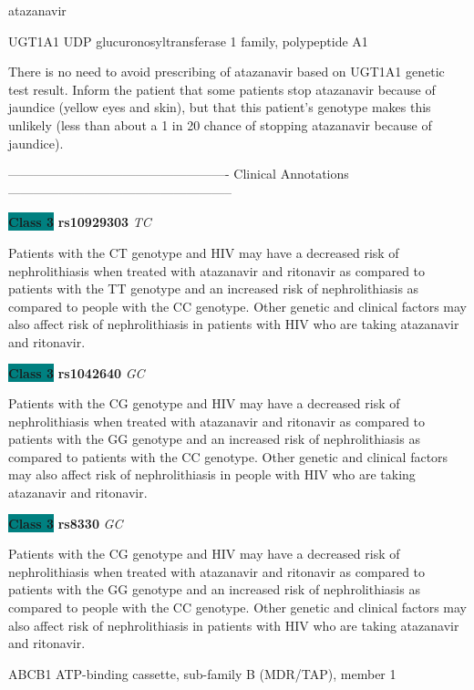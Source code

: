 \documentclass{resume} %
\begin{document}
\begin{rSection}{ atazanavir }
\begin{rSubsection}{ UGT1A1 }{ UDP glucuronosyltransferase 1 family, polypeptide A1 }{}{}
\item[] There is no need to avoid prescribing of atazanavir based on UGT1A1 genetic test result. Inform the patient that some patients stop atazanavir because of jaundice (yellow eyes and skin), but that this patient’s genotype makes this unlikely (less than about a 1 in 20 chance of stopping atazanavir because of jaundice).
\item[] ---------------------------------------------------- Clinical Annotations -----------------------------------------------------\newline
\item \textbf{\colorbox{teal} {Class 3}} \textbf{ rs10929303 } \textit{ TC }
\item[] Patients with the CT genotype and HIV may have a decreased risk of nephrolithiasis when treated with atazanavir and ritonavir as compared to patients with the TT genotype and an increased risk of nephrolithiasis as compared to people with the CC genotype. Other genetic and clinical factors may also affect risk of nephrolithiasis in patients with HIV who are taking atazanavir and ritonavir. \item \textbf{\colorbox{teal} {Class 3}} \textbf{ rs1042640 } \textit{ GC }
\item[] Patients with the CG genotype and HIV may have a decreased risk of nephrolithiasis when treated with atazanavir and ritonavir as compared to patients with the GG genotype and an increased risk of nephrolithiasis as compared to patients with the CC genotype. Other genetic and clinical factors may also affect risk of nephrolithiasis in people with HIV who are taking atazanavir and ritonavir.\item \textbf{\colorbox{teal} {Class 3}} \textbf{ rs8330 } \textit{ GC }
\item[] Patients with the CG genotype and HIV may have a decreased risk of nephrolithiasis when treated with atazanavir and ritonavir as compared to patients with the GG genotype and an increased risk of nephrolithiasis as compared to people with the CC genotype. Other genetic and clinical factors may also affect risk of nephrolithiasis in patients with HIV who are taking atazanavir and ritonavir.
\end{rSubsection}\begin{rSubsection}{ ABCB1 }{ ATP-binding cassette, sub-family B (MDR/TAP), member 1 }{}{}
\item[]


\end{rSubsection}
\end{rSection}
\end{document}
